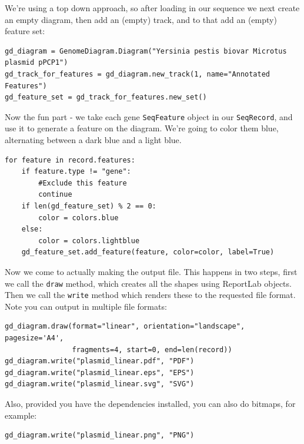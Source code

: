 \documentclass{report}
\begin{document}
We're using a top down approach, so after loading in our sequence we next
create an empty diagram, then add an (empty) track, and to that add an
(empty) feature set:

\begin{verbatim}
gd_diagram = GenomeDiagram.Diagram("Yersinia pestis biovar Microtus plasmid pPCP1")
gd_track_for_features = gd_diagram.new_track(1, name="Annotated Features")
gd_feature_set = gd_track_for_features.new_set()
\end{verbatim}

Now the fun part - we take each gene \verb|SeqFeature| object in our
\verb|SeqRecord|, and use it to generate a feature on the diagram. We're
going to color them blue, alternating between a dark blue and a light blue.
\begin{verbatim}
for feature in record.features:
    if feature.type != "gene":
        #Exclude this feature
        continue
    if len(gd_feature_set) % 2 == 0:
        color = colors.blue
    else:
        color = colors.lightblue
    gd_feature_set.add_feature(feature, color=color, label=True)
\end{verbatim}

Now we come to actually making the output file.  This happens in two steps,
first we call the \verb|draw| method, which creates all the shapes using
ReportLab objects.  Then we call the \verb|write| method which renders these
to the requested file format.  Note you can output in multiple file formats:

\begin{verbatim}
gd_diagram.draw(format="linear", orientation="landscape", pagesize='A4',
                fragments=4, start=0, end=len(record))
gd_diagram.write("plasmid_linear.pdf", "PDF")
gd_diagram.write("plasmid_linear.eps", "EPS")
gd_diagram.write("plasmid_linear.svg", "SVG")
\end{verbatim}

Also, provided you have the dependencies installed, you can also do bitmaps,
for example:

\begin{verbatim}
gd_diagram.write("plasmid_linear.png", "PNG")
\end{verbatim}
\end{document}
